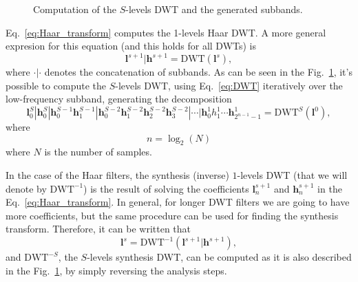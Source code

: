 \begin{figure}
  \centering
  \caption{Computation of the $S$-levels DWT and the generated
    subbands.}
  \label{fig:DWT}
\end{figure}

Eq.~\ref{eq:Haar_transform} computes the 1-levels Haar DWT. A more
general expresion for this equation (and this holds for all DWTs) is
\begin{equation}
  {\mathbf l}^{s+1} | {\mathbf h}^{s+1} = \text{DWT}({\mathbf l}^s),
  \label{eq:DWT}
\end{equation}
where $\cdot|\cdot$ denotes the concatenation of subbands. As can
be seen in the Fig.~\ref{fig:DWT}, it's possible to compute the
$S$-levels DWT, using Eq.~\ref{eq:DWT} iteratively over the
low-frequency subband, generating the decomposition
\begin{equation}
  {\mathbf l}^S_0 | {\mathbf h}^S_0 | {\mathbf h}^{S-1}_0 {\mathbf
    h}^{S-1}_1 | {\mathbf h}^{S-2}_0 {\mathbf h}^{S-2}_1 {\mathbf
    h}^{S-2}_2 {\mathbf h}^{S-2}_3 | \cdots | {\mathbf h}^1_0 h^1_1
  \cdots {\mathbf h}^1_{2^{n-1}-1}=\text{DWT}^S({\mathbf l}^0),
  \label{eq:S_levels_DWT}
\end{equation}
where
\begin{equation}
  n = \log_2(N)
\end{equation}
where $N$ is the number of samples.

In the case of the Haar filters, the synthesis (inverse) $1$-levels
DWT (that we will denote by $\text{DWT}^{-1}$) is the result of
solving the coefficients ${\mathbf l}^{s+1}_n$ and ${\mathbf h}^{s+1}_n$ in the
Eq.~\ref{eq:Haar_transform}. In general, for longer DWT filters we are
going to have more coefficients, but the same procedure can be used
for finding the synthesis transform. Therefore, it can be written that
\begin{equation}
  {\mathbf l}^s = \text{DWT}^{-1}({\mathbf l}^{s+1} | {\mathbf h}^{s+1}),
\end{equation}
and $\text{DWT}^{-S}$, the $S$-levels synthesis DWT, can be computed
as it is also described in the Fig.~\ref{fig:DWT}, by simply reversing
the analysis steps.

